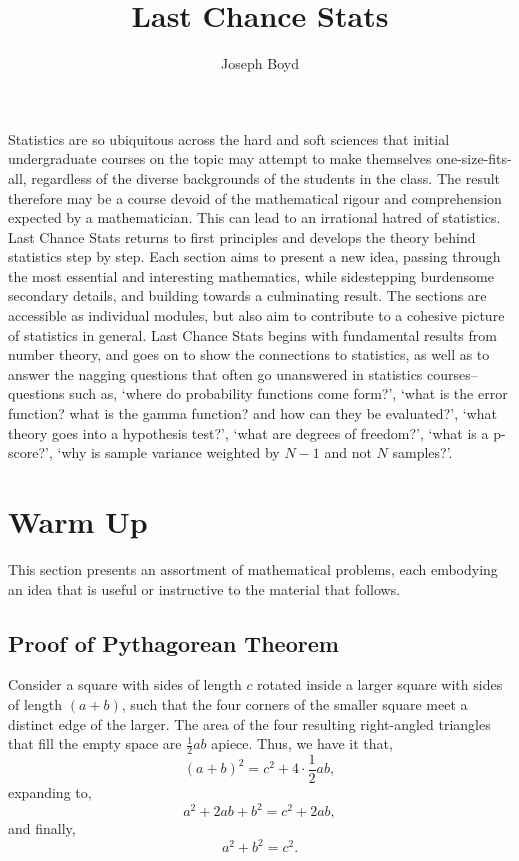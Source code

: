 \documentclass[11pt]{amsart}
\title{Last Chance Stats}
\author{Joseph Boyd}
\begin{document}
\maketitle

\tableofcontents

Statistics are so ubiquitous across the hard and soft sciences that initial undergraduate courses on the topic may attempt to make themselves one-size-fits-all, regardless of the diverse backgrounds of the students in the class. The result therefore may be a course devoid of the mathematical rigour and comprehension expected by a mathematician. This can lead to an irrational hatred of statistics. Last Chance Stats returns to first principles and develops the theory behind statistics step by step. Each section aims to present a new idea, passing through the most essential and interesting mathematics, while sidestepping burdensome secondary details, and building towards a culminating result. The sections are accessible as individual modules, but also aim to contribute to a cohesive picture of statistics in general. Last Chance Stats begins with fundamental results from number theory, and goes on to show the connections to statistics, as well as to answer the nagging questions that often go unanswered in statistics courses--questions such as, `where do probability functions come form?', `what is the error function? what is the gamma function? and how can they be evaluated?', `what theory goes into a hypothesis test?', `what are degrees of freedom?', `what is a p-score?', `why is sample variance weighted by $N-1$ and not $N$ samples?'.

\section{Warm Up}

This section presents an assortment of mathematical problems, each embodying an idea that is useful or instructive to the material that follows.

\subsection{Proof of Pythagorean Theorem}

Consider a square with sides of length $c$ rotated inside a larger square with sides of length $(a + b)$, such that the four corners of the smaller square meet a distinct edge of the larger. The area of the four resulting right-angled triangles that fill the empty space are $\frac{1}{2}ab$ apiece. Thus, we have it that, $$(a + b)^2 = c^2 + 4 \cdot \frac{1}{2}ab,$$ expanding to, $$a^2 + 2ab + b^2 = c^2 + 2ab,$$ and finally, $$a^2 + b^2 = c^2.$$
\end{document}
